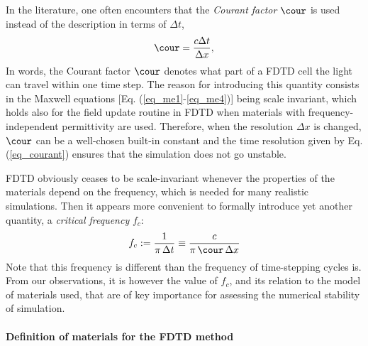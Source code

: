 In the literature, one often encounters that the \textit{Courant factor} $\cour$ is used instead of the description in terms of $\Delta t$,
\begin{equation} \cour = \frac{c \Delta t}{\Delta x}, \label{eq_courant}\end{equation}
In words, the Courant factor $\cour$ denotes what part of a FDTD cell the light can travel within one time step. 
The reason for introducing this quantity consists in the Maxwell equations [Eq. (\ref{eq_me1}-\ref{eq_me4})] being scale invariant, which holds also for the field update routine in FDTD when materials with frequency-independent permittivity are used. Therefore, when the resolution $\Delta x$ is changed, $\cour$ can be a well-chosen built-in constant and the time resolution given by Eq. (\ref{eq_courant}) ensures that the simulation does not go unstable.

FDTD obviously ceases to be scale-invariant whenever the properties of the materials depend on the frequency, which is needed for many realistic simulations. Then it appears more convenient to formally introduce yet another quantity, a \textit{critical frequency} $f_c$:
\begin{equation} f_c := \frac{1}{\pi \, \Delta t} \equiv \frac{c}{\pi\, \cour\, \Delta x} \label{eq_fc}\end{equation}
Note that this frequency is different %
than the frequency of time-stepping cycles is. From our observations, it is however the value of $f_c$, and its relation to the model of materials used, that are of key importance for assessing the numerical stability of simulation. %

\paragraph{Definition of materials for the FDTD method} %
\label{def_of_mat}

